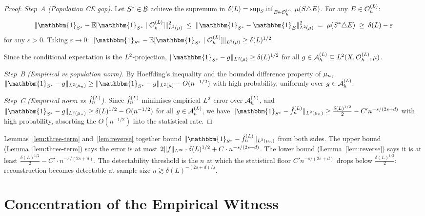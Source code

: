 \begin{proof}
\emph{Step~A (Population CE gap).}
Let $S^* \in \mathcal{B}$ achieve the supremum in $\delta(L) = \sup_S \inf_{E \in \mathcal{O}_h^{(L)}} \mu(S \triangle E)$.
For any $E \in \mathcal{O}_h^{(L)}$:
\[
  \|\mathbbm{1}_{S^*} - \mathbb{E}[\mathbbm{1}_{S^*} \mid \OhL]\|_{\Lp{2}(\mu)}^2
  \;\leq\;
  \|\mathbbm{1}_{S^*} - \mathbbm{1}_E\|_{\Lp{2}(\mu)}^2
  \;=\; \mu(S^* \triangle E) \;\geq\; \delta(L) - \varepsilon
\]
for any $\varepsilon > 0$.
Taking $\varepsilon \to 0$: $\|\mathbbm{1}_{S^*} - \mathbb{E}[\mathbbm{1}_{S^*} \mid \OhL]\|_{\Lp{2}(\mu)}
\geq \delta(L)^{1/2}$.

Since the conditional expectation is the $L^{2}$-projection,
$\|\mathbbm{1}_{S^*} - g\|_{\Lp{2}(\mu)} \geq \delta(L)^{1/2}$ for all $g \in \mathcal{A}_h^{(L)} \subseteq L^{2}(X, \mathcal{O}_h^{(L)}, \mu)$.

\emph{Step~B (Empirical vs population norm).}
By Hoeffding's inequality and the bounded difference property of $\mu_n$,
$\|\mathbbm{1}_{S^*} - g\|_{\Lp{2}(\mun)} \geq \|\mathbbm{1}_{S^*} - g\|_{\Lp{2}(\mu)} - O(n^{-1/2})$
with high probability, uniformly over $g \in \mathcal{A}_h^{(L)}$.

\emph{Step~C (Empirical norm vs $\hat{f}_n^{(L)}$).}
Since $\hat{f}_n^{(L)}$ minimises empirical $L^{2}$ error over $\mathcal{A}_h^{(L)}$, and
$\|\mathbbm{1}_{S^*} - g\|_{\Lp{2}(\mun)} \geq \delta(L)^{1/2} - O(n^{-1/2})$
for all $g \in \mathcal{A}_h^{(L)}$, we have
$\|\mathbbm{1}_{S^*} - \fhat\|_{\Lp{2}(\mun)} \geq \frac{\delta(L)^{1/2}}{2} - C' n^{-s/(2s+d)}$
with high probability, absorbing the $O(n^{-1/2})$ into the statistical rate.
\end{proof}

\begin{remark}
\label{rem:closed-loop}
Lemmas~\ref{lem:three-term} and~\ref{lem:reverse} together bound
$\|\mathbbm{1}_{S^*} - \fhat\|_{\Lp{2}(\mun)}$ from both sides.
The upper bound (Lemma~\ref{lem:three-term}) says the error is at most
$2\|f\|_{L^{\infty}}\cdot\delta(L)^{1/2} + C\cdot n^{-s/(2s+d)}$.
The lower bound (Lemma~\ref{lem:reverse}) says it is at least
$\frac{\delta(L)^{1/2}}{2} - C'\cdot n^{-s/(2s+d)}$.
The detectability threshold is the $n$ at which the statistical floor
$C' n^{-s/(2s+d)}$ drops below $\frac{\delta(L)^{1/2}}{2}$:
reconstruction becomes detectable at sample size $n \gtrsim \delta(L)^{-(2s+d)/s}$.
\end{remark}

\section{Concentration of the Empirical Witness}
\label{sec:concentration}

